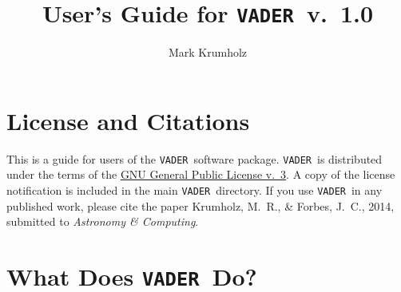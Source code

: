 \documentclass[12pt]{article}
\newcommand{\vader}{\texttt{VADER}}
\begin{document}
\title{User's Guide for \vader\ v.~1.0}
\author{Mark Krumholz}

\maketitle

\tableofcontents

\clearpage

\section{License and Citations}

This is a guide for users of the \vader\ software package. \vader\ is distributed under the terms of the \href{http://www.gnu.org/licenses/gpl.html}{GNU General Public License v.~3}. A copy of the license notification is included in the main \vader\ directory. If you use \vader\ in any published work, please cite the paper Krumholz, M.~R., \& Forbes, J.~C., 2014, submitted to \textit{Astronomy \& Computing}.


\section{What Does \vader\ Do?}
\end{document}
